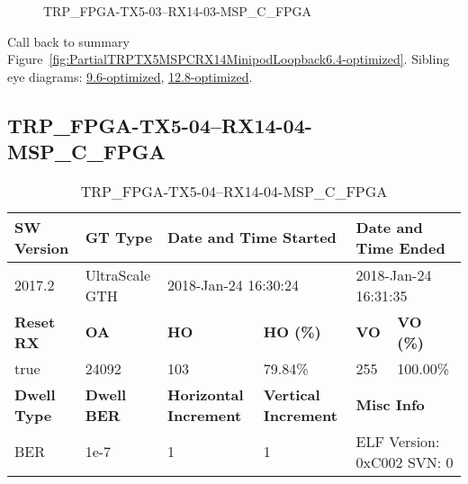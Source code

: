 \begin{figure}[h]
\caption{TRP\_FPGA-TX5-03--RX14-03-MSP\_C\_FPGA} \label{fig:TRPFPGATX503RX1403MSPCFPGA6.4-optimized}
\end{figure}

Call back to summary Figure~\ref{fig:PartialTRPTX5MSPCRX14MinipodLoopback6.4-optimized}.
Sibling eye diagrams: \hyperref[sec:TRPFPGATX503RX1403MSPCFPGA9.6-optimized]{9.6-optimized}, \hyperref[sec:TRPFPGATX503RX1403MSPCFPGA12.8-optimized]{12.8-optimized}.

\clearpage
\newpage


\subsection{TRP\_FPGA-TX5-04--RX14-04-MSP\_C\_FPGA}\label{sec:TRPFPGATX504RX1404MSPCFPGA6.4-optimized}

\begin{table}[h]
\centering
\caption{TRP\_FPGA-TX5-04--RX14-04-MSP\_C\_FPGA}
\label{tab:TRPFPGATX504RX1404MSPCFPGA6.4-optimized}
\begin{tabular}{@{}|l|l|l|l|l|l|@{}}
\toprule
\textbf{SW Version}                & \textbf{GT Type}   & \multicolumn{2}{l|}{\textbf{Date and Time Started}}            & \multicolumn{2}{l|}{\textbf{Date and Time Ended}}        \\ \midrule
2017.2                       & UltraScale GTH          & \multicolumn{2}{l|}{2018-Jan-24 16:30:24}                   & \multicolumn{2}{l|}{2018-Jan-24 16:31:35}               \\ \midrule
\textbf{Reset RX}                  & \textbf{OA} & \textbf{HO}   & \textbf{HO (\%)} & \textbf{VO} & \textbf{VO (\%)} \\ \midrule
true & 24092        & 103          & 79.84\%        & 255        & 100.00\%       \\ \midrule
\textbf{Dwell Type}                & \textbf{Dwell BER} & \textbf{Horizontal Increment} & \textbf{Vertical Increment}    & \multicolumn{2}{l|}{\textbf{Misc Info}}                  \\ \midrule
BER                            & 1e-7        & 1        & 1           & \multicolumn{2}{l|}{ELF Version: 0xC002 SVN: 0}                         \\ \bottomrule
\end{tabular}
\end{table}

